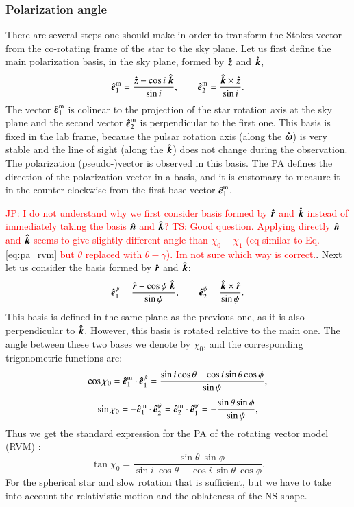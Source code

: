 \documentclass{aa}
\newcommand{\be}{\begin{equation}}
\newcommand{\ee}{\end{equation}}
\newcommand{\unit}[1]{\mbox{\boldmath $\hat{#1}$}}
\newcommand{\red}[1]{\textcolor{red}{#1}}
\begin{document}
\subsubsection{Polarization angle }\label{sec:pa_eqs}

There are several steps one should make in order to transform the Stokes vector from the co-rotating frame of the star to the sky plane.
Let us first define the main polarization basis, in the sky plane, formed by $\unit{z}$ and $\unit{k}$, 
\be 
\label{eq:mbasis}
\unit{e}_1^{\mathrm{m}} = \frac{\unit{z}-\cos{i} \  \unit{k}}{\sin{i}},\qquad 
\unit{e}_2^{\mathrm{m}} = \frac{\unit{k} \times \unit{z}}{\sin{i}}.
\ee
The vector  $\unit{e}_1^{\mathrm{m}}$ is colinear to the projection of the star rotation axis at the sky plane and the second  vector  $\unit{e}_2^{\mathrm{m}}$ is perpendicular to the first one.
This basis is fixed in the lab frame, because the pulsar rotation  axis (along the $\unit{\omega}$) is very stable and the line of sight (along the  $\unit{k}$) does not change during the observation.
The polarization (pseudo-)vector is observed in this basis.
The PA defines the direction of the polarization vector in a basis, and it is customary to measure it in the counter-clockwise from the first base vector $\unit{e}_1^{\mathrm{m}}$.

\red{JP: I do not understand why we first consider basis formed by $\unit{r}$ and $\unit{k}$ instead of immediately taking the basis $\unit{n}$ and $\unit{k}$? }
\red{TS: Good question. Applying directly $\unit{n}$ and $\unit{k}$ seems to give slightly different angle than $\chi_0+\chi_1$ (eq similar to Eq. \eqref{eq:pa_rvm} but $\theta$ replaced with $\theta-\gamma$). Im not sure which way is correct.}.
Next let us consider the basis formed by $\unit{r}$ and $\unit{k}$:
\be\label{eq:rbasis}
\unit{e}^{\psi}_1 = \frac{\unit{r}-\cos{\psi}\ \unit{k}}{\sin{\psi}},\qquad 
\unit{e}^{\psi}_2 = \frac{\unit{k} \times \unit{r}}{\sin{\psi}}.
\ee
This basis is defined in the same plane as the previous one, as it is also perpendicular to $\unit{k}$. 
However, this basis is rotated relative to the main one.  
The angle between these two bases we denote by $\chi_0$, and
the corresponding trigonometric functions are:
\be
\cos{\chi_0}=\unit{e}_1^{\mathrm{m}} \cdot \unit{e}^{\psi}_1 = \frac{\sin{i}\cos{\theta}-\cos{i} \sin{\theta}\cos{\phi}}{\sin{\psi}} , 
\ee \be \label{eq:chi0}
\sin{\chi_0}= - \unit{e}_1^{\mathrm{m}} \cdot \unit{e}^{\psi}_2 = \unit{e}_2^{\mathrm{m}} \cdot \unit{e}^{\psi}_1 = - \frac{\sin{\theta}\sin{\phi}}{\sin{\psi}} ,
\ee
Thus we get the standard expression for the PA of the rotating vector model (RVM) \citep{RC69}:
\be \label{eq:pa_rvm}
\tan\chi_0= \frac{-\sin \theta\ \sin \phi}
{\sin i\ \cos \theta  - \cos i\ \sin \theta\  \cos \phi }.
\ee
For the spherical star and slow rotation that is sufficient, but we have to take into account the relativistic motion and the oblateness of the NS shape.
\end{document}
